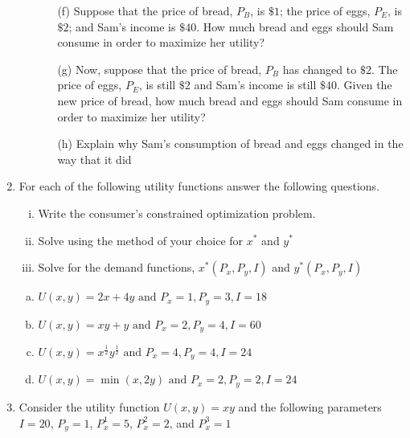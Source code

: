 \documentclass[11pt]{article}
\begin{document}
\begin{enumerate}
\begin{enumerate}
\begin{enumerate}[(a)]
    \newpage
    \item[(f)] Suppose that the price of bread, $P_B$, is $\$1$; the price of eggs, $P_E$, is $\$2$; and Sam's income is $\$40$. How much bread and eggs should Sam consume in order to maximize her utility?
    
    
    \vspace*{50mm}
    \item[(g)] Now, suppose that the price of bread, $P_B$ has changed to $\$2$. The price of eggs, $P_E$, is still $\$2$ and Sam's income is still $\$40$. Given the new price of bread, how much bread and eggs should Sam consume in order to maximize her utility?
    
    \vspace*{50mm}
    \item[(h)] Explain why Sam's consumption of bread and eggs changed in the way that it did
  \end{enumerate}
\end{enumerate}

\newpage
  \item For each of the following utility functions answer the following questions.
  	  \begin{enumerate}[(i)]
    \item Write the consumer's constrained optimization problem.
    \item Solve using the method of your choice for $x^{*}$ and $y^{*}$
    \item Solve for the demand functions, $x^*(P_x, P_y, I)$ and $y^*(P_x, P_y, I)$
  \end{enumerate}

  \begin{enumerate}[(a)]
    \item $U(x,y) = 2x + 4y \text{ and } P_x = 1, P_y = 3, I = 18$    
    
    \vspace*{95mm}
	\item $U(x,y) = xy + y \text{ and } P_x = 2, P_y = 4, I = 60$
    
\newpage
    \item $U(x,y) = x^{\frac{1}{2}} y^{\frac{1}{2}}  \text{ and } P_x = 4, P_y = 4, I = 24$


	\vspace*{110mm}
	\item $U(x,y) = \min(x, 2y) \text{ and } P_x = 2, P_y = 2, I = 24$    
  \end{enumerate}	  
\newpage
  \item Consider the utility function $U(x,y) = xy$ and the following parameters $I = 20$, $P_{y} = 1$, $P_{x}^{1} = 5$, $P_{x}^{2} = 2$, and $P_{x}^{3} = 1$
  

\end{enumerate}
\end{document}

